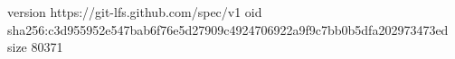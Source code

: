 version https://git-lfs.github.com/spec/v1
oid sha256:c3d955952e547bab6f76e5d27909c4924706922a9f9c7bb0b5dfa202973473ed
size 80371
